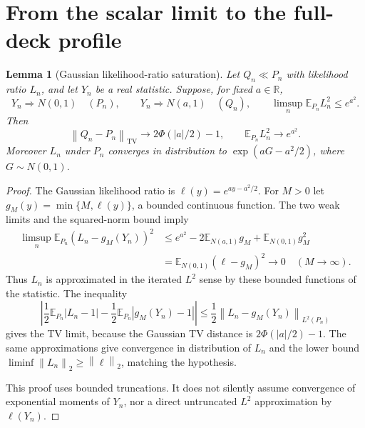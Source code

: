 \documentclass[11pt]{article}
\newtheorem{lemma}[theorem]{Lemma}
\theoremstyle{remark}
\newcommand{\E}{\mathbb E}
\newcommand{\R}{\mathbb R}
\newcommand{\TV}{\operatorname{TV}}
\newcommand{\norm}[1]{\left\lVert #1\right\rVert}
\begin{document}
\section{From the scalar limit to the full-deck profile}\label{sec:squeeze}
\begin{lemma}[Gaussian likelihood-ratio saturation]\label{lem:saturation}
Let $Q_n\ll P_n$ with likelihood ratio $L_n$, and let $Y_n$ be a real statistic. Suppose, for fixed $a\in\R$,
\[
 Y_n\Longrightarrow N(0,1)\quad(P_n),\qquad
 Y_n\Longrightarrow N(a,1)\quad(Q_n),\qquad
 \limsup_n\E_{P_n}L_n^2\leq e^{a^2}.
\]
Then
\[
 \norm{Q_n-P_n}_{\TV}\longrightarrow2\Phi(|a|/2)-1,
 \qquad \E_{P_n}L_n^2\longrightarrow e^{a^2}.
\]
Moreover $L_n$ under $P_n$ converges in distribution to
$\exp(aG-a^2/2)$, where $G\sim N(0,1)$.
\end{lemma}
\begin{proof}
The Gaussian likelihood ratio is $\ell(y)=e^{ay-a^2/2}$. For $M>0$ let
$g_M(y)=\min\{M,\ell(y)\}$, a bounded continuous function. The two weak limits and the squared-norm bound imply
\begin{align*}
 \limsup_n\E_{P_n}(L_n-g_M(Y_n))^2
 &\leq e^{a^2}-2\E_{N(a,1)}g_M+\E_{N(0,1)}g_M^2\\
 &=\E_{N(0,1)}(\ell-g_M)^2\longrightarrow0
 \quad(M\to\infty).
\end{align*}
Thus $L_n$ is approximated in the iterated $L^2$ sense by these bounded functions of the statistic. The inequality
\[
 \left|\frac12\E_{P_n}|L_n-1|-\frac12\E_{P_n}|g_M(Y_n)-1|\right|
 \leq\frac12\norm{L_n-g_M(Y_n)}_{L^2(P_n)}
\]
gives the TV limit, because the Gaussian TV distance is $2\Phi(|a|/2)-1$.
The same approximations give convergence in distribution of $L_n$ and the lower bound
$\liminf\norm{L_n}_2\geq\norm\ell_2$, matching the hypothesis.

This proof uses bounded truncations. It does not silently assume convergence of exponential moments of $Y_n$, nor a direct untruncated $L^2$ approximation by $\ell(Y_n)$.
\end{proof}
\end{document}
